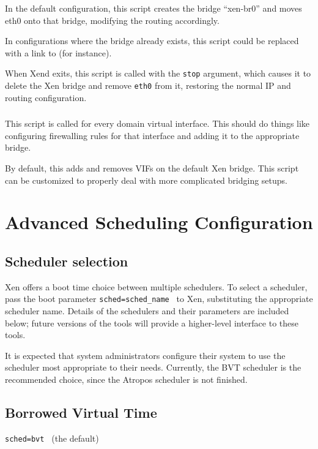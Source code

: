 \documentclass[11pt,twoside,final,openright]{xenstyle}
\begin{document}
{In the default configuration, this script creates the bridge
``xen-br0'' and moves eth0 onto that bridge, modifying the routing
accordingly.

In configurations where the bridge already exists, this script could
be replaced with a link to  (for instance).

When Xend exits, this script is called with the {\tt stop} argument,
which causes it to delete the Xen bridge and remove {\tt eth0} from
it, restoring the normal IP and routing configuration.

\subsection{}

This script is called for every domain virtual interface.  This should
do things like configuring firewalling rules for that interface and
adding it to the appropriate bridge.

By default, this adds and removes VIFs on the default Xen bridge.
This script can be customized to properly deal with more complicated
bridging setups.

\chapter{Advanced Scheduling Configuration}

\section{Scheduler selection}

Xen offers a boot time choice between multiple schedulers.  To select
a scheduler, pass the boot parameter { \tt sched=sched\_name } to Xen,
substituting the appropriate scheduler name.  Details of the schedulers
and their parameters are included below; future versions of the tools
will provide a higher-level interface to these tools.

It is expected that system administrators configure their system to
use the scheduler most appropriate to their needs.  Currently, the BVT
scheduler is the recommended choice, since the Atropos scheduler is
not finished.

\section{Borrowed Virtual Time}

{\tt sched=bvt } (the default) \\ 

}
\end{document}
